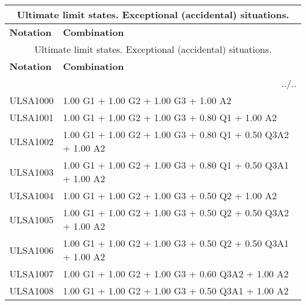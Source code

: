 \begin{center}
\begin{small}
\begin{longtable}{|l|p{10cm}|}
\hline
\multicolumn{2}{|c|}{Ultimate limit states. Exceptional (accidental) situations.}\\
\hline
\textbf{Notation} & \textbf{Combination} \\
\hline
\endfirsthead
\hline
\multicolumn{2}{|c|}{Ultimate limit states. Exceptional (accidental) situations.}\\
\hline
\textbf{Notation} & \textbf{Combination} \\
\hline
\endhead
\hline \multicolumn{2}{|r|}{{../..}} \\ \hline
\endfoot
\hline
\endlastfoot
ULSA1000 & 1.00 G1 + 1.00 G2 + 1.00 G3 + 1.00 A2\\
ULSA1001 & 1.00 G1 + 1.00 G2 + 1.00 G3 + 0.80 Q1 + 1.00 A2\\
ULSA1002 & 1.00 G1 + 1.00 G2 + 1.00 G3 + 0.80 Q1 + 0.50 Q3A2 + 1.00 A2\\
ULSA1003 & 1.00 G1 + 1.00 G2 + 1.00 G3 + 0.80 Q1 + 0.50 Q3A1 + 1.00 A2\\
ULSA1004 & 1.00 G1 + 1.00 G2 + 1.00 G3 + 0.50 Q2 + 1.00 A2\\
ULSA1005 & 1.00 G1 + 1.00 G2 + 1.00 G3 + 0.50 Q2 + 0.50 Q3A2 + 1.00 A2\\
ULSA1006 & 1.00 G1 + 1.00 G2 + 1.00 G3 + 0.50 Q2 + 0.50 Q3A1 + 1.00 A2\\
ULSA1007 & 1.00 G1 + 1.00 G2 + 1.00 G3 + 0.60 Q3A2 + 1.00 A2\\
ULSA1008 & 1.00 G1 + 1.00 G2 + 1.00 G3 + 0.50 Q3A1 + 1.00 A2\\
\hline
\end{longtable}
\end{small}
\end{center}
